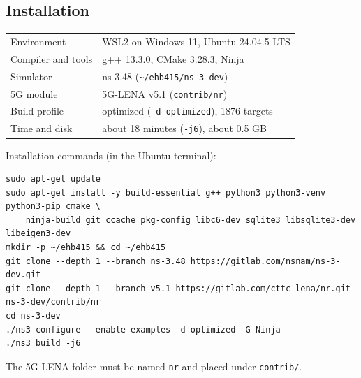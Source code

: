 \documentclass[10.5pt,a4paper]{article}
\newenvironment{codebox}{\par\noindent\begin{minipage}{\textwidth}}{\end{minipage}\par}
\begin{document}
\subsection{Installation}
\begin{center}\sffamily\small
\begin{tabular}{@{}ll@{}}
\toprule
Environment & WSL2 on Windows 11, Ubuntu 24.04.5 LTS \\
Compiler and tools & g++ 13.3.0, CMake 3.28.3, Ninja \\
Simulator & ns-3.48 (\texttt{\textasciitilde/ehb415/ns-3-dev}) \\
5G module & 5G-LENA v5.1 (\texttt{contrib/nr}) \\
Build profile & optimized (\texttt{-d optimized}), 1876 targets \\
Time and disk & about 18 minutes (\texttt{-j6}), about 0.5 GB \\
\bottomrule
\end{tabular}
\end{center}
\begin{codebox}Installation commands (in the Ubuntu terminal):\par
\begin{lstlisting}
sudo apt-get update
sudo apt-get install -y build-essential g++ python3 python3-venv python3-pip cmake \
    ninja-build git ccache pkg-config libc6-dev sqlite3 libsqlite3-dev libeigen3-dev
mkdir -p ~/ehb415 && cd ~/ehb415
git clone --depth 1 --branch ns-3.48 https://gitlab.com/nsnam/ns-3-dev.git
git clone --depth 1 --branch v5.1 https://gitlab.com/cttc-lena/nr.git ns-3-dev/contrib/nr
cd ns-3-dev
./ns3 configure --enable-examples -d optimized -G Ninja
./ns3 build -j6
\end{lstlisting}
\end{codebox}
The 5G-LENA folder must be named \texttt{nr} and placed under \texttt{contrib/}.
\end{document}
